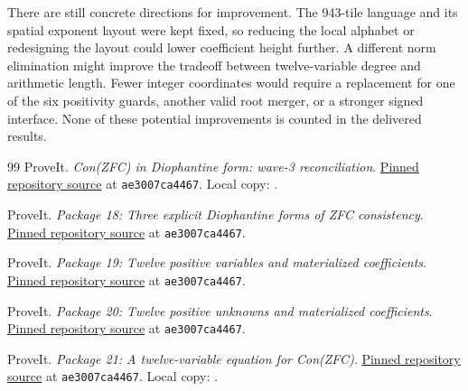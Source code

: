 \documentclass[11pt,letterpaper]{article}
\theoremstyle{remark}
\begin{document}
There are still concrete directions for improvement.  The 943-tile
language and its spatial exponent layout were kept fixed, so reducing
the local alphabet or redesigning the layout could lower coefficient
height further.  A different norm elimination might improve the tradeoff
between twelve-variable degree and arithmetic length.  Fewer integer
coordinates would require a replacement for one of the six positivity
guards, another valid root merger, or a stronger signed interface.
None of these potential improvements is counted in the delivered results.



\clearpage
\begin{thebibliography}{99}
ProveIt. \emph{Con(ZFC) in Diophantine form: wave-3 reconciliation}.
\href{https://github.com/VladimirReshetnikov/ProveIt/blob/ae3007ca4467011e0e051c84acb4a1dd13971b0e/SetTheory/Cardinals/docs/reports/hilbert-tenth-problem/con-zfc-diophantine-forms/README.md}{Pinned repository source} at \texttt{ae3007ca4467}. Local copy: .

ProveIt. \emph{Package 18: Three explicit Diophantine forms of ZFC consistency}.
\href{https://github.com/VladimirReshetnikov/ProveIt/blob/ae3007ca4467011e0e051c84acb4a1dd13971b0e/SetTheory/Cardinals/docs/reports/hilbert-tenth-problem/con-zfc-diophantine-forms/18-jones9/README.md}{Pinned repository source} at \texttt{ae3007ca4467}.

ProveIt. \emph{Package 19: Twelve positive variables and materialized coefficients}.
\href{https://github.com/VladimirReshetnikov/ProveIt/blob/ae3007ca4467011e0e051c84acb4a1dd13971b0e/SetTheory/Cardinals/docs/reports/hilbert-tenth-problem/con-zfc-diophantine-forms/19-wang943/README.md}{Pinned repository source} at \texttt{ae3007ca4467}.

ProveIt. \emph{Package 20: Twelve positive unknowns and materialized coefficients}.
\href{https://github.com/VladimirReshetnikov/ProveIt/blob/ae3007ca4467011e0e051c84acb4a1dd13971b0e/SetTheory/Cardinals/docs/reports/hilbert-tenth-problem/con-zfc-diophantine-forms/20-root12/README.md}{Pinned repository source} at \texttt{ae3007ca4467}.

ProveIt. \emph{Package 21: A twelve-variable equation for Con(ZFC)}.
\href{https://github.com/VladimirReshetnikov/ProveIt/blob/ae3007ca4467011e0e051c84acb4a1dd13971b0e/SetTheory/Cardinals/docs/reports/hilbert-tenth-problem/con-zfc-diophantine-forms/21-norm12/proofs/NORM12_PROOF.md}{Pinned repository source} at \texttt{ae3007ca4467}. Local copy: .


\end{thebibliography}
\end{document}
